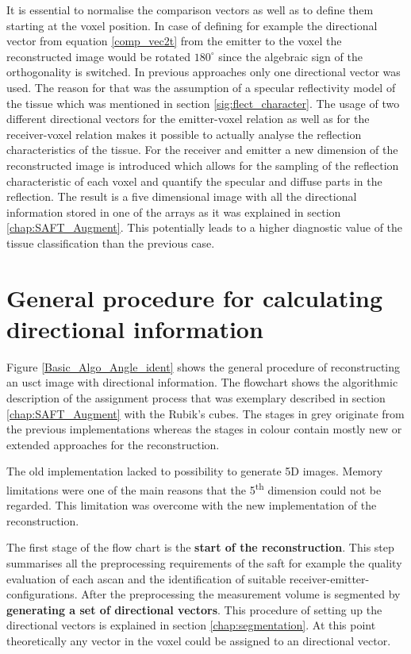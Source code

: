 It is essential to normalise the comparison vectors as well as to define them starting at the voxel position. In case of defining for example the directional vector from equation \ref{comp_vec2t} from the emitter to the voxel the reconstructed image would be rotated $180^{\circ}$ since the algebraic sign of the orthogonality is switched.
In previous approaches only one directional vector was used. The reason for that was the assumption of a specular reflectivity model of the tissue which was mentioned in section \ref{sig:flect_character}. The usage of two different directional vectors for the emitter-voxel relation as well as for the receiver-voxel relation makes it possible to actually analyse the reflection characteristics of the tissue. For the receiver and emitter a new dimension of the reconstructed image is introduced which allows for the sampling of the reflection characteristic of each voxel and quantify the specular and diffuse parts in the reflection. The result is a five dimensional image with all the directional information stored in one of the arrays as it was explained in section \ref{chap:SAFT_Augment}. This potentially leads to a higher diagnostic value of the tissue classification than the previous case.



\section{General procedure for calculating directional information}
\label{chap:algo_for_direction_recon}

Figure \ref{Basic_Algo_Angle_ident} shows the general procedure of reconstructing an \ac{usct} image with directional information. The flowchart shows the algorithmic description of the assignment process that was exemplary described in section \ref{chap:SAFT_Augment} with the Rubik's cubes. The stages in grey originate from the previous implementations whereas the stages in colour contain mostly new or extended approaches for the reconstruction. 

The old implementation lacked to possibility to generate 5D images. Memory limitations were one of the main reasons that the 5\textsuperscript{th} dimension could not be regarded. This limitation was overcome with the new implementation of the reconstruction.

The first stage of the flow chart is the \textbf{start of the reconstruction}. This step summarises all the preprocessing requirements of the \ac{saft} for example the quality evaluation of each \ac{ascan} and the identification of suitable receiver-emitter-configurations.
After the preprocessing the measurement volume is segmented by \textbf{generating a set of directional vectors}. This procedure of setting up the directional vectors is explained in section \ref{chap:segmentation}. At this point theoretically any vector in the voxel could be assigned to an directional vector. 

